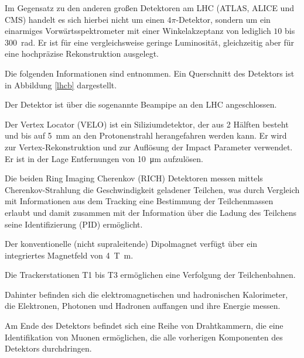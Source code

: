Im Gegensatz zu den anderen großen Detektoren am LHC (ATLAS, ALICE und CMS) handelt es sich hierbei nicht um einen $4π$-Detektor, sondern um ein einarmiges Vorwärtsspektrometer mit einer Winkelakzeptanz von lediglich $10$ bis \SI{300}{\radian}.
Er ist für eine vergleichsweise geringe Luminosität, gleichzeitig aber für eine hochpräzise Rekonstruktion ausgelegt.

Die folgenden Informationen sind \cite{lhcb} entnommen.
Ein Querschnitt des Detektors ist in Abbildung \ref{lhcb} dargestellt.

Der Detektor ist über die sogenannte Beampipe an den LHC angeschlossen.

Der Vertex Locator (VELO) ist ein Siliziumdetektor, der aus 2 Hälften besteht und bis auf \SI{5}{\milli\metre} an den Protonenstrahl herangefahren werden kann. Er wird zur Vertex-Rekonstruktion und zur Auflösung der Impact Parameter verwendet. Er ist in der Lage Entfernungen von \SI{10}{\micro\metre} aufzulösen.



Die beiden Ring Imaging Cherenkov (RICH) Detektoren messen mittels Cherenkov-Strahlung die Geschwindigkeit geladener Teilchen, was durch Vergleich mit Informationen aus dem Tracking eine Bestimmung der Teilchenmassen erlaubt und damit zusammen mit der Information über die Ladung des Teilchens seine Identifizierung (PID) ermöglicht.

Der konventionelle (nicht supraleitende) Dipolmagnet verfügt über ein integriertes Magnetfeld von \SI{4}{\tesla\metre}.

Die Trackerstationen T1 bis T3 ermöglichen eine Verfolgung der Teilchenbahnen.

Dahinter befinden sich die elektromagnetischen und hadronischen Kalorimeter, die Elektronen, Photonen und Hadronen auffangen und ihre Energie messen.

Am Ende des Detektors befindet sich eine Reihe von Drahtkammern, die eine Identifikation von Muonen ermöglichen, die alle vorherigen Komponenten des Detektors durchdringen.

